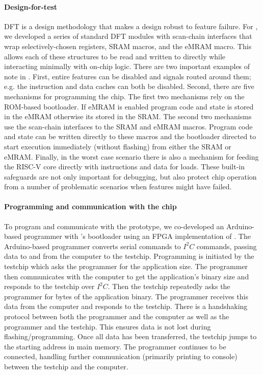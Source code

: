 \paragraph{Design-for-test}
DFT is a design methodology that makes a design robust to feature failure.
% 
For \msilicon, we developed a series of standard DFT modules with scan-chain interfaces that wrap selectively-chosen registers, SRAM macros, and the eMRAM macro.
% 
This allows each of these structures to be read and written to directly while interacting minimally with on-chip logic.
% 
There are two important examples of note in \msilicon.
% 
First, entire features can be disabled and signals routed around them; e.g. the instruction and data caches can both be disabled.
% 
Second, there are five mechanisms for programming the chip.
% 
The first two mechanisms rely on the ROM-based bootloader.
% 
If eMRAM is enabled program code and state is stored in the eMRAM otherwise its stored in the SRAM.
% 
The second two mechanisms use the scan-chain interfaces to the SRAM and eMRAM macros.
% 
Program code and state can be written directly to these macros and the bootloader directed to start execution immediately (without flashing) from either the SRAM or eMRAM.
% 
Finally, in the worst case scenario there is also a mechanism for feeding the RISC-V core directly with instructions and data for loads.
% 
These built-in safeguards are not only important for debugging, but also protect chip operation from a number of problematic scenarios when features might have failed.

\paragraph{Programming and communication with the chip} 
To program and communicate with the \msilicon prototype, we co-developed an Arduino-based programmer with \msilicon's bootloader using an FPGA implementation of \msilicon.
% 
The Arduino-based programmer converts serial commands to $I^2 C$ commands, passing data to and from the computer to the testchip.
% 
Programming is initiated by the testchip which asks the programmer for the application size.
% 
The programmer then communicates with the computer to get the application's binary size and responds to the testchip over $I^2 C$.
% 
Then the testchip repeatedly asks the programmer for bytes of the application binary.
% 
The programmer receives this data from the computer and responds to the testchip.
% 
There is a handshaking protocol between both the programmer and the computer as well as the programmer and the testchip.
% 
This ensures data is not lost during flashing/programming.
% 
Once all data has been transferred, the testchip jumps to the starting address in main memory.
% 
The programmer continues to be connected, handling further communication (primarily printing to console) between the testchip and the computer.

